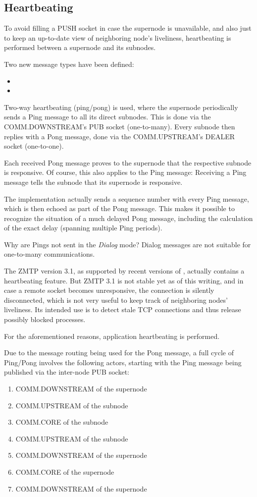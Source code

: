 \subsection{Heartbeating}\label{sec:approach:hb}
To avoid filling a PUSH socket in case the supernode is unavailable, and also
just to keep an up-to-date view of neighboring node's liveliness, heartbeating
is performed between a supernode and its subnodes.


Two new message types have been defined:
\begin{itemize}
	\item {}
	\item {}
\end{itemize}

Two-way heartbeating (ping/pong) is used, where the supernode periodically
sends a Ping message to all its direct
subnodes. This is done via the COMM.DOWNSTREAM's PUB socket (one-to-many).
Every subnode then replies with a Pong
message, done via the COMM.UPSTREAM's DEALER socket (one-to-one).

Each received Pong message proves to the supernode that the respective subnode
is responsive. Of course, this also applies to the Ping message: Receiving a
Ping message tells the subnode that its supernode is responsive.

The implementation actually sends a sequence number with every Ping message,
which is then echoed as part of the Pong message. This makes it possible to
recognize the situation of a much delayed Pong message, including the
calculation of the exact delay (spanning multiple Ping periods).

Why are Pings not sent in the \emph{Dialog} mode? Dialog messages are not
suitable for one-to-many communications.

The \gls{ZMTP} version 3.1, as supported by recent versions of \zmq, actually
contains a heartbeating feature. But ZMTP 3.1 is not stable yet as of this
writing, and in case a remote socket becomes unresponsive, the connection is
silently disconnected, which is not very useful to keep track of neighboring
nodes' liveliness. Its intended use is to detect stale TCP connections and thus
release possibly blocked processes.

For the aforementioned reasons, application heartbeating is performed.

Due to the message routing being used for the Pong message, a full cycle of
Ping/Pong involves the following actors, starting with the Ping message being
published via the inter-node PUB socket:
\begin{enumerate}
	\item COMM.DOWNSTREAM of the supernode
	\item COMM.UPSTREAM  of the subnode
	\item COMM.CORE of the subnode
	\item COMM.UPSTREAM of the subnode
	\item COMM.DOWNSTREAM of the supernode
	\item COMM.CORE of the supernode
	\item COMM.DOWNSTREAM of the supernode
\end{enumerate}

